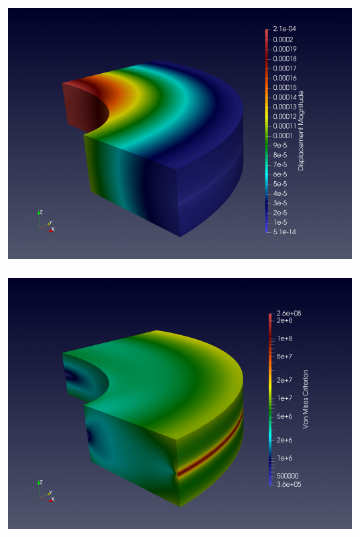 \begin{figure}[h]
  \centering
  \begin{subfigure}[c]{0.49\textwidth}
    \centering
    \includegraphics[width=\textwidth]{graphics/feelpp/feelpp-benchmark-nafems-le10-solution-disp.png}
  \end{subfigure}
  \hfill
  \begin{subfigure}[c]{0.49\textwidth}
    \centering
    \includegraphics[width=\textwidth]{graphics/feelpp/feelpp-benchmark-nafems-le10-solution-vonmises.png}
  \end{subfigure}
  \hfill
  \begin{subfigure}[c]{0.49\textwidth}
    \centering

\end{subfigure}
\end{figure}

